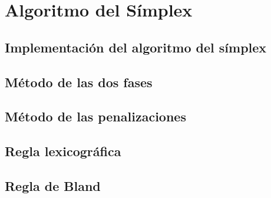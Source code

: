 \chapter{Algoritmo del Símplex}
\label{simp}
\section{Implementación del algoritmo del símplex}
\section{Método de las dos fases}
\section{Método de las penalizaciones}
\section{Regla lexicográfica}
\section{Regla de Bland}